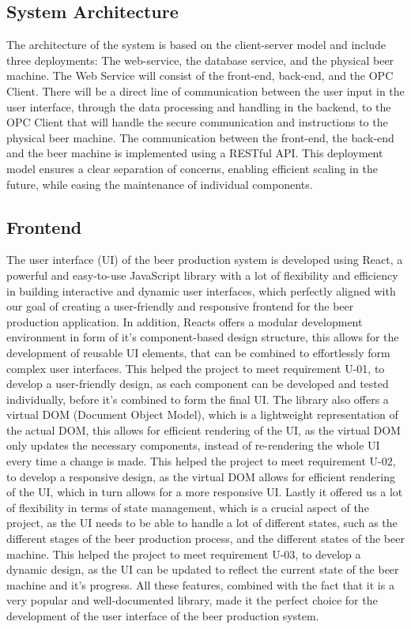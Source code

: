 \subsection{System Architecture}
The architecture of the system is based on the client-server model and include three deployments: The web-service, the database service, and the physical beer machine. \newline
The Web Service will consist of the front-end, back-end, and the OPC Client. There will be a direct line of communication between the user input in the user interface, through the data processing and handling in the backend, to the OPC Client that will handle the secure communication and instructions to the physical beer machine. \newline
The communication between the front-end, the back-end and the beer machine is implemented using a RESTful API. \newline
This deployment model ensures a clear separation of concerns, enabling efficient scaling in the future, while easing the maintenance of individual components.

\subsection{Frontend}
The user interface (UI) of the beer production system is developed using React, a powerful and easy-to-use JavaScript library with a lot of flexibility and efficiency in building interactive and dynamic user interfaces, which perfectly aligned with our goal of creating a user-friendly and responsive frontend for the beer production application.
In addition, Reacts offers a modular development environment in form of it's component-based design structure, this allows for the development of reusable UI elements, that can be combined to effortlessly form complex user interfaces. This helped the project to meet requirement U-01, to develop a user-friendly design, as each component can be developed and tested individually, before it's combined to form the final UI. \newline
The library also offers a virtual DOM (Document Object Model), which is a lightweight representation of the actual DOM, this allows for efficient rendering of the UI, as the virtual DOM only updates the necessary components, instead of re-rendering the whole UI every time a change is made. This helped the project to meet requirement U-02, to develop a responsive design, as the virtual DOM allows for efficient rendering of the UI, which in turn allows for a more responsive UI. \newline
Lastly it offered us a lot of flexibility in terms of state management, which is a crucial aspect of the project, as the UI needs to be able to handle a lot of different states, such as the different stages of the beer production process, and the different states of the beer machine. This helped the project to meet requirement U-03, to develop a dynamic design, as the UI can be updated to reflect the current state of the beer machine and it's progress. \newline
All these features, combined with the fact that it is a very popular and well-documented library, made it the perfect choice for the development of the user interface of the beer production system.
